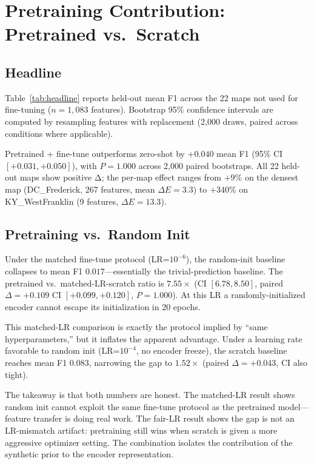 \documentclass[sigconf,nonacm]{acmart}
\begin{document}
\section{Pretraining Contribution: Pretrained vs.\ Scratch}
\label{sec:results}

\subsection{Headline}

Table~\ref{tab:headline} reports held-out mean F1 across the 22 maps not
used for fine-tuning ($n{=}1{,}083$ features). Bootstrap 95\% confidence
intervals are computed by resampling features with replacement (2{,}000
draws, paired across conditions where applicable).



Pretrained $+$ fine-tune outperforms zero-shot by $+0.040$ mean F1 (95\% CI
$[+0.031, +0.050]$), with $P{=}1.000$ across 2{,}000 paired bootstraps. All
22 held-out maps show positive Δ; the per-map effect ranges from
$+9\%$ on the densest map (DC\_Frederick, 267 features, mean
$\Delta E{=}3.3$) to $+340\%$ on KY\_WestFranklin (9 features,
$\Delta E{=}13.3$).

\subsection{Pretraining vs.\ Random Init}

Under the matched fine-tune protocol (LR=$10^{-6}$), the random-init baseline
collapses to mean F1 $0.017$---essentially the trivial-prediction baseline.
The pretrained vs.\ matched-LR-scratch ratio is $7.55\times$ (CI $[6.78, 8.50]$,
paired $\Delta = +0.109$ CI $[+0.099, +0.120]$, $P{=}1.000$). At this LR a
randomly-initialized encoder cannot escape its initialization in 20 epochs.

This matched-LR comparison is exactly the protocol implied by ``same
hyperparameters,'' but it inflates the apparent advantage. Under a learning
rate favorable to random init (LR=$10^{-4}$, no encoder freeze), the scratch
baseline reaches mean F1 $0.083$, narrowing the gap to $1.52\times$
(paired $\Delta = +0.043$, CI also tight).

The takeaway is that both numbers are honest. The matched-LR result shows
random init cannot exploit the same fine-tune protocol as the pretrained
model---feature transfer is doing real work. The fair-LR result shows the
gap is not an LR-mismatch artifact: pretraining still wins when scratch is
given a more aggressive optimizer setting. The combination isolates the
contribution of the synthetic prior to the encoder representation.
\end{document}
